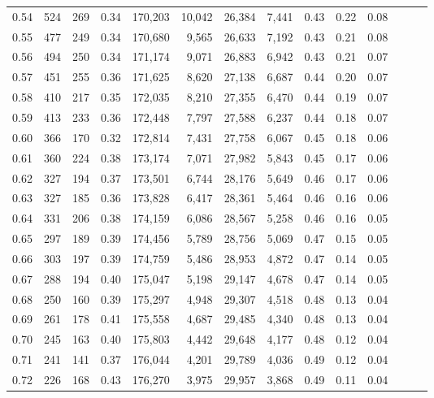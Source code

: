 \begin{tabular}{rrrrrrrrrrrrrr}
0.54 &    524 &  269 &  0.34 &  170,203 &   10,042 &  26,384 &   7,441 &  0.43 &  0.22 &      0.08 \\
0.55 &    477 &  249 &  0.34 &  170,680 &    9,565 &  26,633 &   7,192 &  0.43 &  0.21 &      0.08 \\
0.56 &    494 &  250 &  0.34 &  171,174 &    9,071 &  26,883 &   6,942 &  0.43 &  0.21 &      0.07 \\
0.57 &    451 &  255 &  0.36 &  171,625 &    8,620 &  27,138 &   6,687 &  0.44 &  0.20 &      0.07 \\
0.58 &    410 &  217 &  0.35 &  172,035 &    8,210 &  27,355 &   6,470 &  0.44 &  0.19 &      0.07 \\
0.59 &    413 &  233 &  0.36 &  172,448 &    7,797 &  27,588 &   6,237 &  0.44 &  0.18 &      0.07 \\
0.60 &    366 &  170 &  0.32 &  172,814 &    7,431 &  27,758 &   6,067 &  0.45 &  0.18 &      0.06 \\
0.61 &    360 &  224 &  0.38 &  173,174 &    7,071 &  27,982 &   5,843 &  0.45 &  0.17 &      0.06 \\
0.62 &    327 &  194 &  0.37 &  173,501 &    6,744 &  28,176 &   5,649 &  0.46 &  0.17 &      0.06 \\
0.63 &    327 &  185 &  0.36 &  173,828 &    6,417 &  28,361 &   5,464 &  0.46 &  0.16 &      0.06 \\
0.64 &    331 &  206 &  0.38 &  174,159 &    6,086 &  28,567 &   5,258 &  0.46 &  0.16 &      0.05 \\
0.65 &    297 &  189 &  0.39 &  174,456 &    5,789 &  28,756 &   5,069 &  0.47 &  0.15 &      0.05 \\
0.66 &    303 &  197 &  0.39 &  174,759 &    5,486 &  28,953 &   4,872 &  0.47 &  0.14 &      0.05 \\
0.67 &    288 &  194 &  0.40 &  175,047 &    5,198 &  29,147 &   4,678 &  0.47 &  0.14 &      0.05 \\
0.68 &    250 &  160 &  0.39 &  175,297 &    4,948 &  29,307 &   4,518 &  0.48 &  0.13 &      0.04 \\
0.69 &    261 &  178 &  0.41 &  175,558 &    4,687 &  29,485 &   4,340 &  0.48 &  0.13 &      0.04 \\
0.70 &    245 &  163 &  0.40 &  175,803 &    4,442 &  29,648 &   4,177 &  0.48 &  0.12 &      0.04 \\
0.71 &    241 &  141 &  0.37 &  176,044 &    4,201 &  29,789 &   4,036 &  0.49 &  0.12 &      0.04 \\
0.72 &    226 &  168 &  0.43 &  176,270 &    3,975 &  29,957 &   3,868 &  0.49 &  0.11 &      0.04 \\

\end{tabular}
